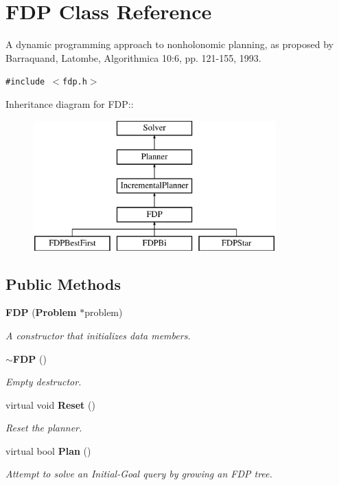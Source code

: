\section{FDP  Class Reference}
\label{classFDP}
A dynamic programming approach to nonholonomic planning, as proposed by Barraquand, Latombe, Algorithmica 10:6, pp. 121-155, 1993. 


{\tt \#include $<$fdp.h$>$}

Inheritance diagram for FDP::\begin{figure}[H]
\begin{center}
\leavevmode
\includegraphics[height=5cm]{classFDP}
\end{center}
\end{figure}
\subsection*{Public Methods}
\begin{CompactItemize}
\item 
{\bf FDP} ({\bf Problem} $\ast$problem)
\begin{CompactList}\small\item\em A constructor that initializes data members.\item\end{CompactList}\item 
{\bf $\sim$FDP} ()
\begin{CompactList}\small\item\em Empty destructor.\item\end{CompactList}\item 
virtual void {\bf Reset} ()
\begin{CompactList}\small\item\em Reset the planner.\item\end{CompactList}\item 
virtual bool {\bf Plan} ()
\begin{CompactList}\small\item\em Attempt to solve an Initial-Goal query by growing an FDP tree.\item\end{CompactList}\end{CompactItemize}
